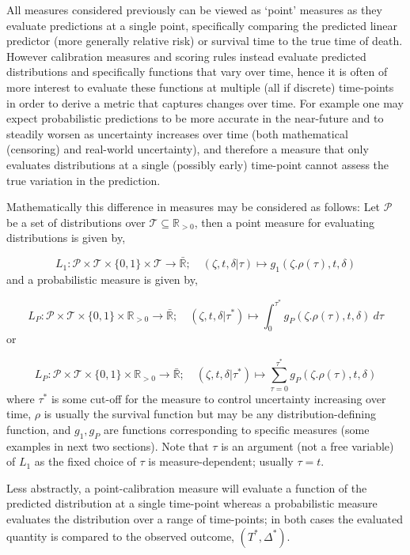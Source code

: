 \documentclass[
  letterpaper,
]{scrbook}
\theoremstyle{plain}
\theoremstyle{definition}
\theoremstyle{remark}
\begin{document}
All measures considered previously can be viewed as `point' measures as
they evaluate predictions at a single point, specifically comparing the
predicted linear predictor (more generally relative risk) or survival
time to the true time of death. However calibration measures and scoring
rules instead evaluate predicted distributions and specifically
functions that vary over time, hence it is often of more interest to
evaluate these functions at multiple (all if discrete) time-points in
order to derive a metric that captures changes over time. For example
one may expect probabilistic predictions to be more accurate in the
near-future and to steadily worsen as uncertainty increases over time
(both mathematical (censoring) and real-world uncertainty), and
therefore a measure that only evaluates distributions at a single
(possibly early) time-point cannot assess the true variation in the
prediction.

Mathematically this difference in measures may be considered as follows:
Let \(\mathcal{P}\) be a set of distributions over
\(\mathcal{T}\subseteq \mathbb{R}_{>0}\), then a point measure for
evaluating distributions is given by,

\[
L_1: \mathcal{P}\times \mathcal{T}\times \{0,1\}\times \mathcal{T}\rightarrow \bar{\mathbb{R}}; \quad
(\zeta, t, \delta|\tau) \mapsto g_1(\zeta.\rho(\tau), t, \delta)
\] and a probabilistic measure is given by,

\[
L_P: \mathcal{P}\times \mathcal{T}\times \{0,1\}\times \mathbb{R}_{>0}\rightarrow \bar{\mathbb{R}}; \quad
(\zeta, t, \delta|\tau^*) \mapsto \int_0^{\tau^*} g_P(\zeta.\rho(\tau), t, \delta) \ d\tau
\] or

\[
L_P: \mathcal{P}\times \mathcal{T}\times \{0,1\}\times \mathbb{R}_{>0}\rightarrow \bar{\mathbb{R}}; \quad
(\zeta, t, \delta|\tau^*) \mapsto \sum_{\tau = 0}^{\tau^*} g_P(\zeta.\rho(\tau), t, \delta)
\] where \(\tau^*\) is some cut-off for the measure to control
uncertainty increasing over time, \(\rho\) is usually the survival
function but may be any distribution-defining function, and \(g_1,g_P\)
are functions corresponding to specific measures (some examples in next
two sections). Note that \(\tau\) is an argument (not a free variable)
of \(L_1\) as the fixed choice of \(\tau\) is measure-dependent; usually
\(\tau = t\).

Less abstractly, a point-calibration measure will evaluate a function of
the predicted distribution at a single time-point whereas a
probabilistic measure evaluates the distribution over a range of
time-points; in both cases the evaluated quantity is compared to the
observed outcome, \((T^*, \Delta^*)\).
\end{document}
